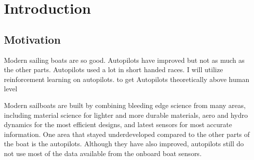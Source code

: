\documentclass[12pt,twoside]{report}
\date{May 2021}
\begin{document}



\pagestyle{fancy}

\tableofcontents 


\clearpage{\pagestyle{empty}%
}
\fancyhead[LE,RO]{\slshape \rightmark}
\fancyhead[LO,RE]{\slshape \leftmark}


\chapter{Introduction}

\section{Motivation}
Modern sailing boats are so good.
Autopilots have improved but not as much as the other parts.
Autopilots used a lot in short handed races.
I will utilize reinforcement learning on autopilots.
to get Autopilots theoretically above human level

Modern sailboats are built by combining bleeding edge science from many areas, including material science for lighter and more durable materials, aero and hydro dynamics for the most efficient designs, and latest sensors for most accurate information. One area that stayed underdeveloped compared to the other parts of the boat is the autopilots. Although they have also improved, autopilots still do not use most of the data available from the onboard boat sensors.
\end{document}
